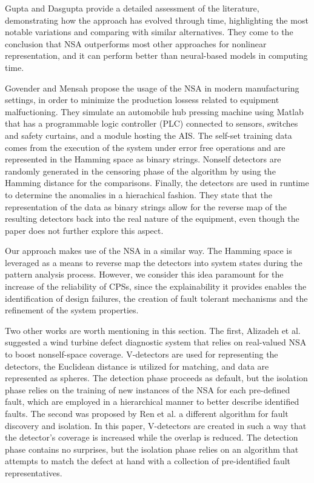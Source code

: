 Gupta and Dasgupta \cite{NSAResearch2021} provide a detailed assessment of the literature, demonstrating how the approach has evolved through time, highlighting the most notable variations and comparing with similar alternatives. They come to the conclusion that NSA outperforms most other approaches for nonlinear representation, and it can perform better than neural-based models in computing time.  

Govender and Mensah \cite{govender2010fault} propose the usage of the NSA in modern manufacturing settings, in order to minimize the production lossess related to equipment malfuctioning. They simulate an automobile hub pressing machine using Matlab that has a programmable logic controller (PLC) connected to sensors, switches and safety curtains, and a module hosting the AIS. The self-set training data comes from the execution of the system under error free operations and are represented in the Hamming space as binary strings. Nonself detectors are randomly generated in the censoring phase of the algorithm by using the Hamming distance for the comparisons. Finally, the detectors are used in runtime to determine the anomalies in a hierachical fashion. They state that the representation of the data as binary strings allow for the reverse map of the resulting detectors back into the real nature of the equipment, even though the paper does not further explore this aspect.

Our approach makes use of the NSA in a similar way. The Hamming space is leveraged as a means to reverse map the detectors into system states during the pattern analysis process. However, we consider this idea paramount for the increase of the reliability of CPSs, since the explainability it provides enables the identification of design failures, the creation of fault tolerant mechanisms and the refinement of the system properties.

Two other works are worth mentioning in this section. The first, Alizadeh et al. \cite{alizadeh2016negative} suggested a wind turbine defect diagnostic system that relies on real-valued NSA to boost nonself-space coverage. V-detectors are used for representing the detectors, the Euclidean distance is utilized for matching, and data are represented as spheres. The detection phase proceeds as default, but the isolation phase relies on the training of new instances of the NSA for each pre-defined fault, which are employed in a hierarchical manner to better describe identified faults. The second was proposed by Ren et al. \cite{ren2020novel} a different algorithm for fault discovery and isolation. In this paper, V-detectors are created in such a way that the detector's coverage is increased while the overlap is reduced. The detection phase contains no surprises, but the isolation phase relies on an algorithm that attempts to match the defect at hand with a collection of pre-identified fault representatives.

